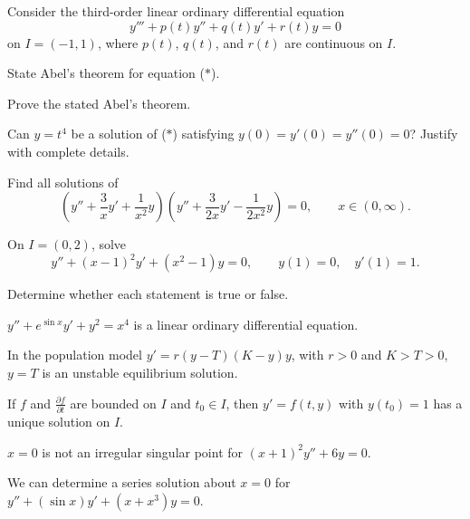\documentclass[11pt,oneside]{article}
\begin{document}
\begin{problem}
Consider the third-order linear ordinary differential equation
\[
y'''+p(t)y''+q(t)y'+r(t)y=0\tag{$*$}
\]
on $I=(-1,1)$, where $p(t)$, $q(t)$, and $r(t)$ are continuous on $I$.
\begin{problemsubparts}
\item State Abel's theorem for equation ($*$).
\item Prove the stated Abel's theorem.
\item Can $y=t^4$ be a solution of ($*$) satisfying $y(0)=y'(0)=y''(0)=0$? Justify with complete details.
\end{problemsubparts}
\end{problem}

\begin{problem}
Find all solutions of
\[
\left(y''+\frac3x y'+\frac1{x^2}y\right)
\left(y''+\frac{3}{2x}y'-\frac1{2x^2}y\right)=0,
\qquad x\in(0,\infty).
\]
\end{problem}

\begin{problem}
On $I=(0,2)$, solve
\[
y''+(x-1)^2y'+(x^2-1)y=0,
\qquad y(1)=0,\quad y'(1)=1.
\]
\end{problem}

\begin{problem}
Determine whether each statement is true or false.
\begin{problemchoices}
\item $y''+e^{\sin x}y'+y^2=x^4$ is a linear ordinary differential equation.
\item In the population model $y'=r(y-T)(K-y)y$, with $r>0$ and $K>T>0$, $y=T$ is an unstable equilibrium solution.
\item If $f$ and $\frac{\partial f}{\partial t}$ are bounded on $I$ and $t_0\in I$, then $y'=f(t,y)$ with $y(t_0)=1$ has a unique solution on $I$.
\item $x=0$ is not an irregular singular point for $(x+1)^2y''+6y=0$.
\item We can determine a series solution about $x=0$ for $y''+(\sin x)y'+(x+x^3)y=0$.
\end{problemchoices}
\end{problem}
\end{document}
